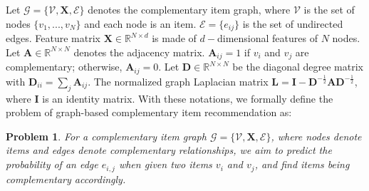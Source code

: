 \documentclass[letterpaper]{article} %
\newtheorem{definition}{Definition}
\newtheorem{problem}{Problem}
\begin{document}

Let $\mathcal{G} = {\{\mathcal{V}, \mathcal{\mathbf{X}}, {\mathcal{E}}}\}$ denotes the complementary item graph, where $\mathcal{V}$ is the set of nodes $ {\{v_1,...,v_N\}}$ and each node is an item.  $\mathcal{E}=\{e_{ij}\}$ is the set of undirected edges. Feature matrix $\mathcal{\mathbf{X}}\in \mathbb{R}^{N\times d}$ is made of $d-$dimensional features of $N$ nodes. Let $\mathbf{A} \in \mathbb{R}^{N\times N}$ denotes the adjacency matrix. $\mathbf{A}_{ij}=1$ if $v_i$ and $v_j$ are complementary; otherwise,  $\mathbf{A}_{ij}=0$. Let $\mathbf{D} \in \mathbb{R}^{N\times N}$ be the diagonal degree matrix with $\mathbf{D}_{ii}=\sum_{j}\mathbf{A}_{ij}$. The normalized graph Laplacian matrix $\mathbf{L}=\mathbf{I}-\mathbf{D}^{-\frac{1}{2}}\mathbf{A}\mathbf{D}^{-\frac{1}{2}}$, where $\mathbf{I}$ is an identity matrix. 
With these notations, we formally define the problem of graph-based complementary item recommendation as:
\begin{problem}
    For a complementary item graph $\mathcal{G} = {\{\mathcal{V}, \mathcal{\mathbf{X}}, {\mathcal{E}}}\}$, where nodes denote items and edges denote complementary relationships, we aim to predict the probability of an edge $e_{i,j}$ when given two items $v_i$ and $v_j$, and find items being complementary accordingly. 
\end{problem}


\end{document}
